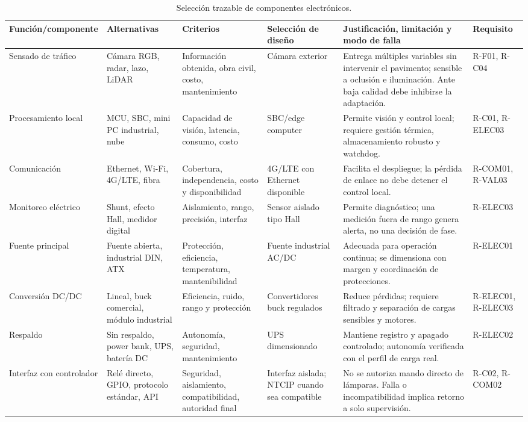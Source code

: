 \begin{landscape}
\begin{table}[htbp]
  \centering
  \caption{Selección trazable de componentes electrónicos.}
  \label{tab:seleccion-electronica}
  \footnotesize
  \begin{tabular}{@{}p{3.1cm}p{3.6cm}p{3.8cm}p{2.9cm}p{5.6cm}p{3.1cm}@{}}
    \toprule
    \textbf{Función/componente} & \textbf{Alternativas} & \textbf{Criterios} & \textbf{Selección de diseño} & \textbf{Justificación, limitación y modo de falla} & \textbf{Requisito}\\
    \midrule
    Sensado de tráfico & Cámara RGB, radar, lazo, LiDAR & Información obtenida, obra civil, costo, mantenimiento & Cámara exterior & Entrega múltiples variables sin intervenir el pavimento; sensible a oclusión e iluminación. Ante baja calidad debe inhibirse la adaptación. & R-F01, R-C04\\
    Procesamiento local & MCU, SBC, mini PC industrial, nube & Capacidad de visión, latencia, consumo, costo & SBC/edge computer & Permite visión y control local; requiere gestión térmica, almacenamiento robusto y watchdog. & R-C01, R-ELEC03\\
    Comunicación & Ethernet, Wi-Fi, 4G/LTE, fibra & Cobertura, independencia, costo y disponibilidad & 4G/LTE con Ethernet disponible & Facilita el despliegue; la pérdida de enlace no debe detener el control local. & R-COM01, R-VAL03\\
    Monitoreo eléctrico & Shunt, efecto Hall, medidor digital & Aislamiento, rango, precisión, interfaz & Sensor aislado tipo Hall & Permite diagnóstico; una medición fuera de rango genera alerta, no una decisión de fase. & R-ELEC03\\
    Fuente principal & Fuente abierta, industrial DIN, ATX & Protección, eficiencia, temperatura, mantenibilidad & Fuente industrial AC/DC & Adecuada para operación continua; se dimensiona con margen y coordinación de protecciones. & R-ELEC01\\
    Conversión DC/DC & Lineal, buck comercial, módulo industrial & Eficiencia, ruido, rango y protección & Convertidores buck regulados & Reduce pérdidas; requiere filtrado y separación de cargas sensibles y motores. & R-ELEC01, R-ELEC03\\
    Respaldo & Sin respaldo, power bank, UPS, batería DC & Autonomía, seguridad, mantenimiento & UPS dimensionado & Mantiene registro y apagado controlado; autonomía verificada con el perfil de carga real. & R-ELEC02\\
    Interfaz con controlador & Relé directo, GPIO, protocolo estándar, API & Seguridad, aislamiento, compatibilidad, autoridad final & Interfaz aislada; NTCIP cuando sea compatible & No se autoriza mando directo de lámparas. Falla o incompatibilidad implica retorno a solo supervisión. & R-C02, R-COM02\\
    \bottomrule
  \end{tabular}
\end{table}
\end{landscape}

